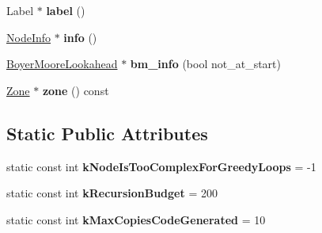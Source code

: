\begin{DoxyCompactItemize}
\item 
\hypertarget{classv8_1_1internal_1_1_reg_exp_node_a1a0b5a61d350613e23c5014f80e79d3e}{}Label $\ast$ {\bfseries label} ()\label{classv8_1_1internal_1_1_reg_exp_node_a1a0b5a61d350613e23c5014f80e79d3e}

\item 
\hypertarget{classv8_1_1internal_1_1_reg_exp_node_a9a3f9318b3322877937dbd62b479531d}{}\hyperlink{structv8_1_1internal_1_1_node_info}{Node\+Info} $\ast$ {\bfseries info} ()\label{classv8_1_1internal_1_1_reg_exp_node_a9a3f9318b3322877937dbd62b479531d}

\item 
\hypertarget{classv8_1_1internal_1_1_reg_exp_node_a11d15a06b5e058ace41d292bdb261c9a}{}\hyperlink{classv8_1_1internal_1_1_boyer_moore_lookahead}{Boyer\+Moore\+Lookahead} $\ast$ {\bfseries bm\+\_\+info} (bool not\+\_\+at\+\_\+start)\label{classv8_1_1internal_1_1_reg_exp_node_a11d15a06b5e058ace41d292bdb261c9a}

\item 
\hypertarget{classv8_1_1internal_1_1_reg_exp_node_aa35e3ffbc83c944ea9bf6360ec8579ab}{}\hyperlink{classv8_1_1internal_1_1_zone}{Zone} $\ast$ {\bfseries zone} () const \label{classv8_1_1internal_1_1_reg_exp_node_aa35e3ffbc83c944ea9bf6360ec8579ab}

\end{DoxyCompactItemize}
\subsection*{Static Public Attributes}
\begin{DoxyCompactItemize}
\item 
\hypertarget{classv8_1_1internal_1_1_reg_exp_node_acdf311f0dacb16f281babbdd2ed30a70}{}static const int {\bfseries k\+Node\+Is\+Too\+Complex\+For\+Greedy\+Loops} = -\/1\label{classv8_1_1internal_1_1_reg_exp_node_acdf311f0dacb16f281babbdd2ed30a70}

\item 
\hypertarget{classv8_1_1internal_1_1_reg_exp_node_ac77fc160c5ff5db7808583c401c65ede}{}static const int {\bfseries k\+Recursion\+Budget} = 200\label{classv8_1_1internal_1_1_reg_exp_node_ac77fc160c5ff5db7808583c401c65ede}

\item 
\hypertarget{classv8_1_1internal_1_1_reg_exp_node_aee16545e1cda3652a44891cefb9e60ad}{}static const int {\bfseries k\+Max\+Copies\+Code\+Generated} = 10\label{classv8_1_1internal_1_1_reg_exp_node_aee16545e1cda3652a44891cefb9e60ad}

\end{DoxyCompactItemize}
